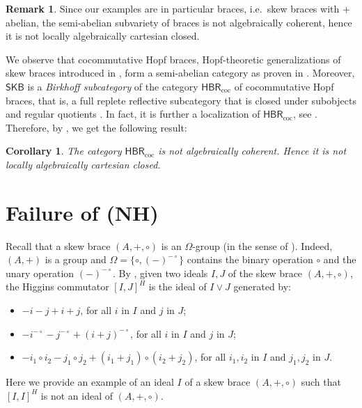 \documentclass{amsart}
\newtheorem{corollary}[theorem]{Corollary}
\theoremstyle{definition}
\newtheorem{remark}[theorem]{Remark}
\begin{document}
\begin{remark}
Since our examples are in particular braces, i.e.\ skew braces with $+$ abelian, the semi-abelian subvariety of braces is not algebraically coherent, hence it is not locally algebraically cartesian closed. %
\end{remark}

We observe that cocommutative Hopf braces, Hopf-theoretic generalizations of skew braces introduced in \cite{AGV}, form a semi-abelian category as proven in \cite{GranSciandra}. Moreover, $\mathsf{SKB}$ is a \textit{Birkhoff subcategory} of the category $\mathsf{HBR}_{\mathrm{coc}}$ of cocommutative Hopf braces, that is, a full
replete reflective subcategory that is closed under subobjects and regular quotients \cite[Corollary 6.11]{GranSciandra}. In fact, it is further a localization of $\mathsf{HBR}_{\mathrm{coc}}$, see \cite[Theorem 6.12]{GranSciandra}. Therefore, by \cite[Proposition 3.7]{CGvdL}, we get the following result:

\begin{corollary}
    The category $\mathsf{HBR}_{\mathrm{coc}}$ is not algebraically coherent. Hence it is not locally algebraically cartesian closed.
\end{corollary}

\section{Failure of (NH)}
Recall that a skew brace $(A,+,\circ)$ is an $\Omega$-group (in the sense of \cite{Higgins}). Indeed, $(A,+)$ is a group and $\Omega =\{\circ,(-)^{-\circ}\}$ contains the binary operation $\circ$ and the unary operation $(-)^{-\circ}$. By \cite[Theorem 4B]{Higgins}, given two ideals $I,J$ of the skew brace $(A,+,\circ)$, the Higgins commutator $[I,J]^H$ is the ideal of $I \lor J$ generated by: 
\begin{itemize}
    \item $-i-j+i+j$, for all $i$ in $I$ and $j$ in $J$;
    \item $-i^{-\circ}-j^{-\circ}+(i+j)^{- \circ}$, for all $i$ in $I$ and $j$ in $J$;
    \item $-i_1 \circ i_2 - j_1 \circ j_2 + (i_1 +j_1)\circ (i_2 +j_2) $, for all $i_1,i_2$ in $I$ and $j_1,j_2$ in $J$.
\end{itemize}

Here we provide an example of an ideal $I$ of a skew brace $(A,+,\circ)$ such that $[I,I]^H$ is not an ideal of $(A,+,\circ)$. \medskip
\end{document}
